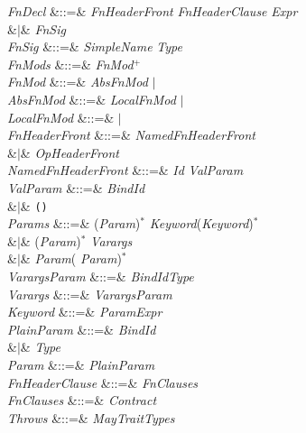 \begin{Grammar}
\emph{FnDecl}
&::=&  \emph{FnHeaderFront} \emph{FnHeaderClause}
\EXP{=} \emph{Expr} \\
&$|$& \emph{FnSig} \\

\emph{FnSig} &::=& \emph{SimpleName} \EXP{\mathrel{\mathtt{:}}} \emph{Type}\\

\emph{FnMods} &::=& \emph{FnMod}$^+$\\

\emph{FnMod} &::=& \emph{AbsFnMod} $|$ \\

\emph{AbsFnMod} &::=& \emph{LocalFnMod} $|$
\\

\emph{LocalFnMod} &::=&  $|$ \\

\emph{FnHeaderFront}
&::=& \emph{NamedFnHeaderFront}\\
&$|$& \emph{OpHeaderFront} \\

\emph{NamedFnHeaderFront}
&::=& \emph{Id}  \emph{ValParam} \\

\emph{ValParam} &::=& \emph{BindId}\\
&$|$& \texttt(\texttt)\\

\emph{Params}
&::=&
(\emph{Param}\EXP{,})$^*$  \emph{Keyword}(\EXP{,}\emph{Keyword})$^*$\\
&$|$&
(\emph{Param}\EXP{,})$^*$  \emph{Varargs}\\
&$|$& \emph{Param}(\EXP{,} \emph{Param})$^*$\\

\emph{VarargsParam} &::=& \emph{BindId}\EXP{\COLONOP}\emph{Type} \\

\emph{Varargs} &::=& \emph{VarargsParam}\\

\emph{Keyword} &::=& \emph{Param}\EXP{=}\emph{Expr} \\

\emph{PlainParam} &::=& \emph{BindId}  \\
&$|$& \emph{Type} \\

\emph{Param} &::=& \emph{PlainParam}\\

\emph{FnHeaderClause} &::=&  \emph{FnClauses} \\

\emph{FnClauses} &::=&  
\emph{Contract} \\

\emph{Throws} &::=&  \emph{MayTraitTypes}\\

\end{Grammar}

